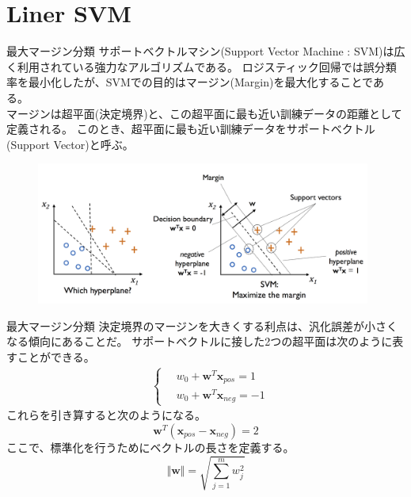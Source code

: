 \documentclass[aspectratio=169, dvipdfmx, 11pt]{beamer} %
\begin{document}
\section{Liner SVM}
\begin{frame}{最大マージン分類}
    サポートベクトルマシン(Support Vector Machine : SVM)は広く利用されている強力なアルゴリズムである。
    ロジスティック回帰では誤分類率を最小化したが、SVMでの目的はマージン(Margin)を最大化することである。\\
    マージンは超平面(決定境界)と、この超平面に最も近い訓練データの距離として定義される。
    このとき、超平面に最も近い訓練データをサポートベクトル(Support Vector)と呼ぶ。
    \begin{figure}[b]
        \begin{center}
        \includegraphics[width=110mm]{img/day02/fig05.png}
        \end{center}
    \end{figure}
\end{frame}

\begin{frame}{最大マージン分類}
    決定境界のマージンを大きくする利点は、汎化誤差が小さくなる傾向にあることだ。
    サポートベクトルに接した2つの超平面は次のように表すことができる。
    \begin{equation*}
        \begin{aligned}
            & \left\{ \,
                \begin{aligned}
                    & w_0 + \textbf{w}^T \textbf{x}_{pos} = 1 \\
                    & w_0 + \textbf{w}^T \textbf{x}_{neg} = -1
                \end{aligned}
            \right.
        \end{aligned}
    \end{equation*}
    これらを引き算すると次のようになる。
    \begin{equation*}
        \textbf{w}^T (\textbf{x}_{pos} - \textbf{x}_{neg}) = 2
    \end{equation*}
    ここで、標準化を行うためにベクトルの長さを定義する。
    \begin{equation*}
        \Vert\textbf{w}\Vert = \sqrt{{\textstyle \sum_{j=1}^{m} w_{j}^{2}}}
    \end{equation*}
\end{frame}
\end{document}
